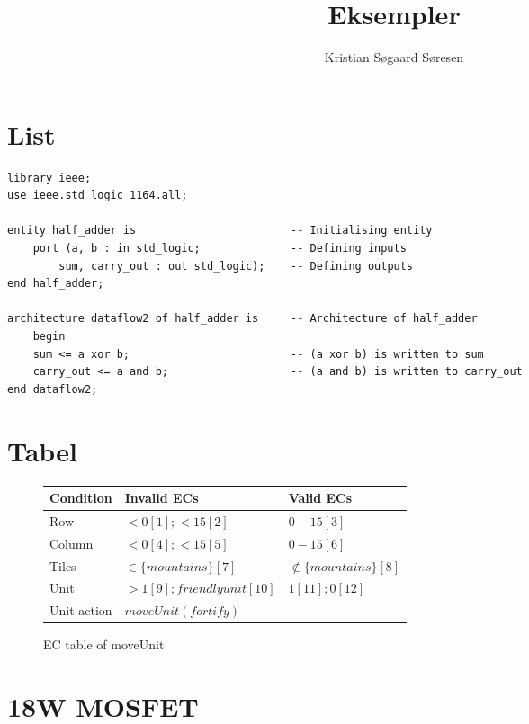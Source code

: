 \documentclass[11pt]{article}
\begin{document}
 
\title{Eksempler}

\author{Kristian Søgaard Søresen}

\maketitle



\section*{List}


\begin{lstlisting}
library ieee;
use ieee.std_logic_1164.all;

entity half_adder is						-- Initialising entity
	port (a, b : in std_logic;				-- Defining inputs
		sum, carry_out : out std_logic);	-- Defining outputs
end half_adder;

architecture dataflow2 of half_adder is		-- Architecture of half_adder
	begin
	sum <= a xor b;							-- (a xor b) is written to sum
	carry_out <= a and b;					-- (a and b) is written to carry_out
end dataflow2;
\end{lstlisting}

\section*{Tabel}

\begin{figure}[!ht]
    \centering
     \begin{tabular}{ l | l | l }
       Condition  & Invalid ECs       		    & Valid ECs     					 \\ \hline
       Row 	      &  $< 0[1]; < 15[2]$          & $0-15[3]$       				 \\
       Column     &  $< 0[4]; < 15[5]$          & $0-15[6]$  					 \\
       Tiles      &  $\in \{ mountains \} [7] $ & $ \notin \{ mountains \} [8]$  \\
       Unit       &  $> 1[9]; friendly unit[10]$& $ 1[11];0[12] $			     \\
       Unit action&  $moveUnit(fortify)$		& 
     \end{tabular}
    \caption{EC table of moveUnit}
\end{figure}

\section*{18W MOSFET}
\end{document}
